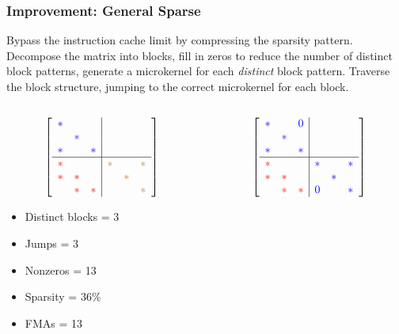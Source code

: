 \documentclass[9pt]{beamer}
\begin{document}
\begin{frame}[fragile]
  \frametitle{Improvement: General Sparse}
  Bypass the instruction cache limit by compressing the sparsity pattern. Decompose the matrix into blocks, fill in zeros to reduce the number of distinct block patterns, generate a microkernel for each \emph{distinct} block pattern. Traverse the block structure, jumping to the correct microkernel for each block. 


\def\r{\color{red}}
\def\g{\color{brown}}
\def\b{\color{blue}}


  \begin{columns}[t]
    \begin{column}{0.3\textwidth}
      \[\left[
          \begin{array}{ccc|ccc}
          \b* &   &   &    &    &    \\
            & \b* &   &    &    &    \\
          \b* &   & \b* &    &    &    \\
          \hline
          \r* &   &   & \g* &   & \g*  \\
          \r* & \r* &   &   & \g* &    \\
            & \r* & \r* &   &   & \g*  \\
          \end{array}
          \right]\]
        \footnotesize
        \begin{itemize}
          \item Distinct blocks = 3
          \item Jumps = 3
          \item Nonzeros = 13
          \item Sparsity = 36\%
          \item FMAs = 13
        \end{itemize}
    \end{column}
    \begin{column}{0.3\textwidth}
      \[
      \left[
          \begin{array}{ccc|ccc}
          \b* &   & \b0 &    &    &    \\
            & \b* &   &    &    &    \\
          \b* &   & \b* &    &    &    \\
          \hline
          \r* &   &   & \b* &   & \b*  \\
          \r* & \r* &   &   & \b* &    \\
            & \r* & \r* & \b0 &   & \b*  \\
          \end{array}
          \right] \]


\end{column}
\end{columns}
\end{frame}
\end{document}
